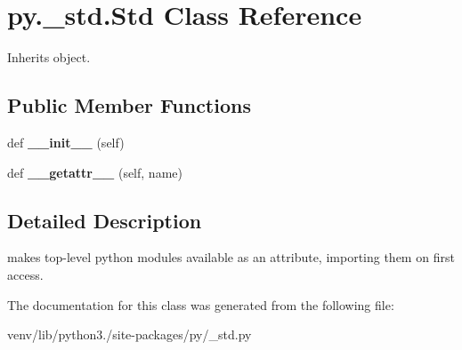 \hypertarget{classpy_1_1__std_1_1_std}{}\section{py.\+\_\+std.\+Std Class Reference}
\label{classpy_1_1__std_1_1_std}


Inherits object.

\subsection*{Public Member Functions}
\begin{DoxyCompactItemize}
\item 
\mbox{\label{classpy_1_1__std_1_1_std_a85502bbfae18eda4afe8f0d9e6d2e93c}} 
def {\bfseries \+\_\+\+\_\+init\+\_\+\+\_\+} (self)
\item 
\mbox{\label{classpy_1_1__std_1_1_std_abf218d321b33c69d3a0260c2fd8607a9}} 
def {\bfseries \+\_\+\+\_\+getattr\+\_\+\+\_\+} (self, name)
\end{DoxyCompactItemize}


\subsection{Detailed Description}
\begin{DoxyVerb}makes top-level python modules available as an attribute,
    importing them on first access.
\end{DoxyVerb}
 

The documentation for this class was generated from the following file\+:\begin{DoxyCompactItemize}
\item 
venv/lib/python3./site-\/packages/py/\+\_\+std.\+py\end{DoxyCompactItemize}
